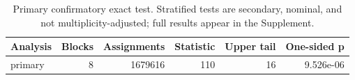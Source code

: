 \begin{table}[!htbp]
\centering
\caption{Primary confirmatory exact test. Stratified tests are secondary, nominal, and not multiplicity-adjusted; full results appear in the Supplement.}
\label{tab:table04-exact-tests-main}
\small
\setlength{\tabcolsep}{4pt}
\begin{tabular}{lrrrrr}
\toprule
Analysis & Blocks & Assignments & Statistic & Upper tail & One-sided p \\
\midrule
primary & 8 & 1679616 & 110 & 16 & 9.526e-06 \\
\bottomrule
\end{tabular}
\end{table}
